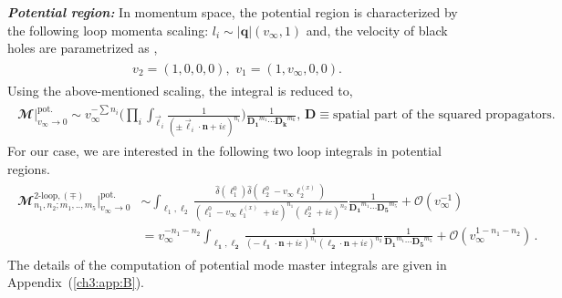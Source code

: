 \textbf{\textit{Potential region:}} In momentum space, the potential region is characterized by the following loop momenta scaling: $l_{i}\sim |\boldsymbol{q}|(v_{\infty},1)$ and, the velocity of black holes are parametrized as \cite{Dlapa:2023hsl}, 
\begin{align}
    \begin{split}
        v_2=(1,0,0,0),\,\, v_1=(1,v_{\infty},0,0).\label{2.23a}
    \end{split}
\end{align}
Using the above-mentioned scaling, the integral is reduced to,
\begin{align}
    \begin{split}
     \mathbfcal{M}\Big|_{v_{\infty}\to 0}^{\textrm{pot.}}\sim    v_{\infty}^{-\sum n_i}\Bigg(\prod_{i}\int_{\vec \ell_i}\frac{1}{(\pm\vec \ell_i\cdot \boldsymbol{n}+i\varepsilon)^{n_i}}\Bigg)\frac{1}{\boldsymbol {D_1}^{m_1}\cdots\boldsymbol{D_k}^{m_k}},\,\boldsymbol D\equiv \textrm{spatial part of the squared propagators.}
    \end{split}
\end{align}
For our case, we are interested in the following two loop integrals in potential regions.
\begin{align}
    \begin{split}
\mathbfcal{M}^{\textrm{2-loop},(\mp)}_{n_1,n_2;m_1,..,m_5}\Big|_{v_{\infty}\to 0}^{\textrm{pot.}}&\sim\int_{\ell_{1},\ell_{2}}\frac{\hat\delta(\ell_{1}^0)\hat\delta(\ell_{2}^0-v_{\infty}\ell_{2}^{(x)})}{(\ell_{1}^0-v_{\infty}\ell_{1}^{(x)}+i\varepsilon)^{n_1}(\ell_{2}^0+i\varepsilon)^{n_2}}\frac{1}{\boldsymbol{D_1}^{m_1}\cdots\boldsymbol{D_5}^{m_5} }+\mathcal{O}(v_{\infty}^{-1})\\ &
=v_{\infty}^{-n_1-n_2}\int_{\boldsymbol{\ell_1},\boldsymbol{\ell_2}}\frac{1}{(-\boldsymbol{\ell_1}\cdot \boldsymbol{n}+i\varepsilon)^{n_1}(\boldsymbol{\ell_2}\cdot \boldsymbol{n}+i\varepsilon)^{n_2}}\frac{1}{\boldsymbol{D_1}^{m_1}\cdots\boldsymbol{D_5}^{m_5} }+\mathcal{O}(v_{\infty}^{1-n_1-n_2})\,.
    \end{split}
\end{align}
The details of the computation of potential mode master integrals are given in Appendix~(\ref{ch3:app:B}).\par


